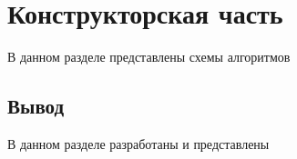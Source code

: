 \section{\large Конструкторская часть}

В данном разделе представлены схемы алгоритмов

\begin{figure}[ht!]
\end{figure}

\subsection*{Вывод}

В данном разделе разработаны и представлены 
